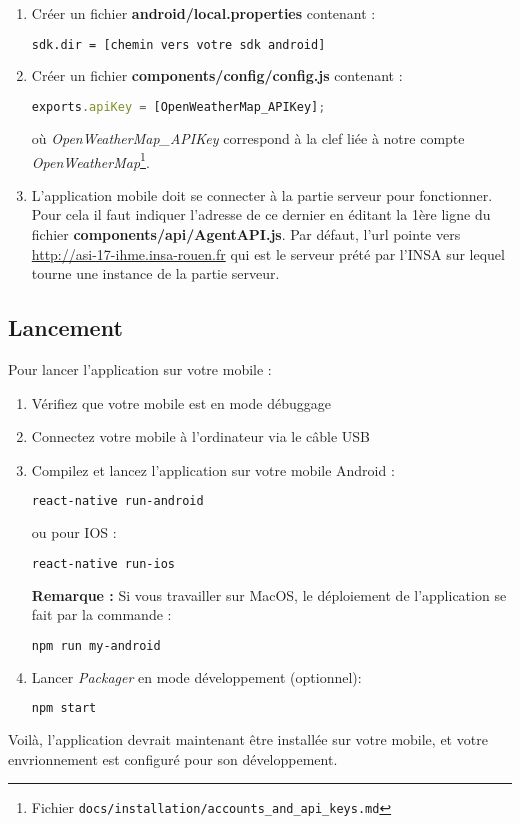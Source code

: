 \begin{enumerate}
  \item Créer un fichier \textbf{android/local.properties} contenant :
  \begin{lstlisting}[language=bash]
  sdk.dir = [chemin vers votre sdk android]
  \end{lstlisting}
  \item Créer un fichier \textbf{components/config/config.js} contenant :
  \begin{lstlisting}[language=Javascript]
  exports.apiKey = [OpenWeatherMap_APIKey];
  \end{lstlisting}

  où \og \emph{OpenWeatherMap\_APIKey} \fg{} correspond à la clef liée à notre compte \emph{OpenWeatherMap}\footnote{Fichier \texttt{docs/installation/accounts\_and\_api\_keys.md}}.

  \item L'application mobile doit se connecter à la partie serveur pour fonctionner. Pour cela il faut indiquer l'adresse de ce dernier en
  éditant la 1ère ligne du fichier \textbf{components/api/AgentAPI.js}. Par défaut, l'url pointe vers \url{http://asi-17-ihme.insa-rouen.fr} qui est le serveur prété par l'INSA sur lequel tourne une instance de la partie serveur.
\end{enumerate}

\subsection{Lancement}

Pour lancer l'application sur votre mobile :
\begin{enumerate}
  \item Vérifiez que votre mobile est en mode débuggage
  \item Connectez votre mobile à l'ordinateur via le câble USB
  \item Compilez et lancez l'application sur votre mobile Android :
  \begin{lstlisting}[language=bash]
    react-native run-android
  \end{lstlisting}
  ou pour IOS :
  \begin{lstlisting}[language=bash]
    react-native run-ios
  \end{lstlisting}

  \textbf{Remarque : } Si vous travailler sur MacOS, le déploiement de l'application se fait par la commande :
  \begin{lstlisting}[language=bash]
    npm run my-android
  \end{lstlisting}

  \item Lancer \emph{Packager} en mode développement (optionnel):
  \begin{lstlisting}[language=bash]
    npm start
  \end{lstlisting}
\end{enumerate}

Voilà, l'application devrait maintenant être installée sur votre mobile, et votre envrionnement est configuré pour son développement.
